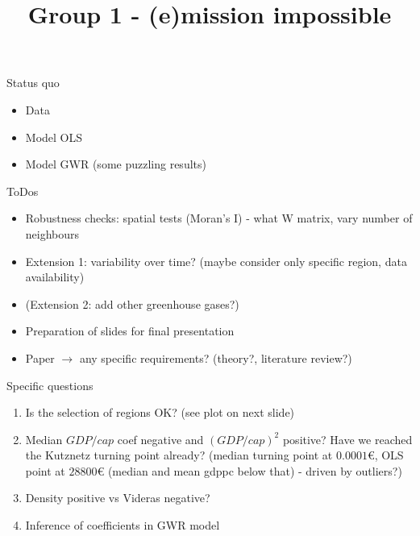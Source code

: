\documentclass[
  ignorenonframetext,
]{beamer}
\title{Group 1 - (e)mission impossible}
\author{}
\date{\vspace{-2.5em}}
\begin{document}
\frame{\titlepage}

\begin{frame}{Status quo}
\protect\hypertarget{status-quo}{}

\begin{itemize}
    \item Data \checkmark
    \item Model OLS \checkmark
    \item Model GWR \checkmark (some puzzling results)
\end{itemize}

\end{frame}

\begin{frame}{ToDos}
\protect\hypertarget{todos}{}

\begin{itemize}
    \item Robustness checks: spatial tests (Moran's I) - what W matrix, vary number of neighbours
    \item Extension 1: variability over time? (maybe consider only specific region, data availability)
    \item (Extension 2: add other greenhouse gases?)
    \item Preparation of slides for final presentation 
    \item Paper $\rightarrow$ any specific requirements? (theory?, literature review?)
\end{itemize}

\end{frame}

\begin{frame}{Specific questions}
\protect\hypertarget{specific-questions}{}

\begin{enumerate}
  \item Is the selection of regions OK? (see plot on next slide)
  \item Median $GDP/cap$ coef negative and $(GDP/cap)^2$ positive? Have we reached the Kutznetz turning point already? (median turning point at $0.0001$€, OLS point at $28800$€ (median and mean gdppc below that) - driven by outliers?)
  \item Density positive vs Videras negative?
  \item Inference of coefficients in GWR model
\end{enumerate}

\end{frame}
\end{document}
